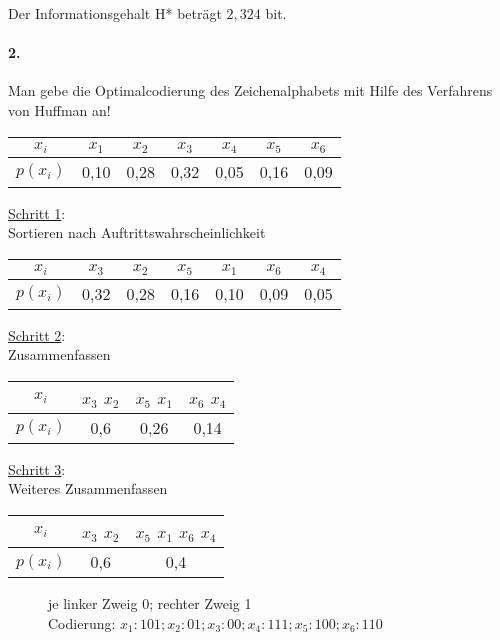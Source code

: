 \documentclass[paper=a4, fontsize=11pt]{scrartcl}
\numberwithin{equation}{section}
\numberwithin{figure}{section}
\numberwithin{table}{section}
\begin{document}
Der Informationsgehalt H* beträgt $2,324$ bit.

\paragraph{2.}
Man gebe die Optimalcodierung des Zeichenalphabets mit Hilfe des Verfahrens von Huffman an! \\

\begin{tabular}{|c||c|c|c|c|c|c|}
\hline
$x_{i}$ & $x_{1}$ & $x_{2}$ & $x_{3}$ & $x_{4}$ & $x_{5}$ & $x_{6}$\\
\hline
$p(x_{i})$ & 0,10 & 0,28 & 0,32 & 0,05 & 0,16 & 0,09 \\
\hline
\end{tabular}

\underline{Schritt 1}: \\
Sortieren nach Auftrittswahrscheinlichkeit

\begin{tabular}{|c||c|c|c|c|c|c|}
\hline
$x_{i}$ & $x_{3}$ & $x_{2}$ & $x_{5}$ & $x_{1}$ & $x_{6}$ & $x_{4}$\\
\hline
$p(x_{i})$ & 0,32 & 0,28 & 0,16 & 0,10 & 0,09 & 0,05 \\
\hline
\end{tabular}

\underline{Schritt 2}: \\
Zusammenfassen

\begin{tabular}{|c||c|c|c|}
\hline
$x_{i}$ & $x_{3}$  $x_{2}$ & $x_{5}$  $x_{1}$ & $x_{6}$  $x_{4}$\\
\hline
$p(x_{i})$ & 0,6 & 0,26 & 0,14 \\
\hline
\end{tabular}

\underline{Schritt 3}: \\
Weiteres Zusammenfassen



\begin{tabular}{|c||c|c|}
\hline
$x_{i}$ & $x_{3}$  $x_{2}$ & $x_{5}$  $x_{1}$ $x_{6}$  $x_{4}$\\
\hline
$p(x_{i})$ & 0,6 & 0,4 \\
\hline
\end{tabular}

\begin{figure}[h!]
\centering
{}
\caption{je linker Zweig 0; rechter Zweig 1 \\
         Codierung: $x_{1}:101;x_{2}:01;x_{3}:00;x_{4}:111;x_{5}:100;x_{6}:110$}
\end{figure}
\end{document}
